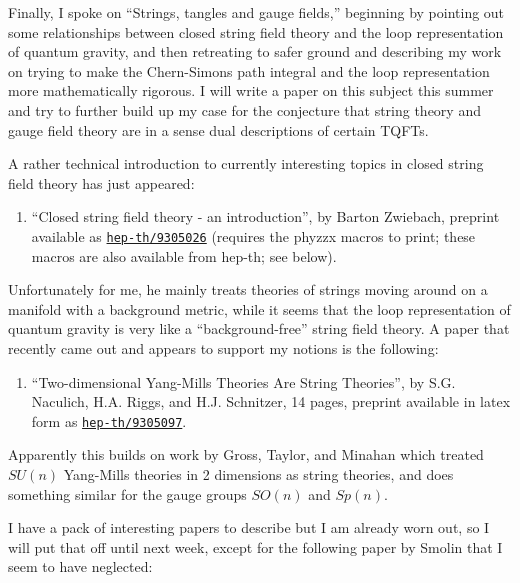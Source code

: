 \documentclass{article}
\def\tightlist{}
\begin{document}
Finally, I spoke on ``Strings, tangles and gauge fields,'' beginning by
pointing out some relationships between closed string field theory and
the loop representation of quantum gravity, and then retreating to safer
ground and describing my work on trying to make the Chern-Simons path
integral and the loop representation more mathematically rigorous. I
will write a paper on this subject this summer and try to further build
up my case for the conjecture that string theory and gauge field theory
are in a sense dual descriptions of certain TQFTs.

A rather technical introduction to currently interesting topics in
closed string field theory has just appeared:

\begin{enumerate}
\def\labelenumi{\arabic{enumi})}
\tightlist
\item
  ``Closed string field theory - an introduction'', by Barton Zwiebach,
  preprint available as
  \href{http://xxx.lanl.gov/abs/hep-th/9305026}{\texttt{hep-th/9305026}}
  (requires the phyzzx macros to print; these macros are also available
  from hep-th; see below).
\end{enumerate}

Unfortunately for me, he mainly treats theories of strings moving around
on a manifold with a background metric, while it seems that the loop
representation of quantum gravity is very like a ``background-free''
string field theory. A paper that recently came out and appears to
support my notions is the following:

\begin{enumerate}
\def\labelenumi{\arabic{enumi})}
\setcounter{enumi}{1}
\tightlist
\item
  ``Two-dimensional Yang-Mills Theories Are String Theories'', by S.G.
  Naculich, H.A. Riggs, and H.J. Schnitzer, 14 pages, preprint available
  in latex form as
  \href{http://xxx.lanl.gov/abs/hep-th/9305097}{\texttt{hep-th/9305097}}.
\end{enumerate}

Apparently this builds on work by Gross, Taylor, and Minahan which
treated \(SU(n)\) Yang-Mills theories in 2 dimensions as string
theories, and does something similar for the gauge groups \(SO(n)\) and
\(Sp(n)\).

I have a pack of interesting papers to describe but I am already worn
out, so I will put that off until next week, except for the following
paper by Smolin that I seem to have neglected:
\end{document}
